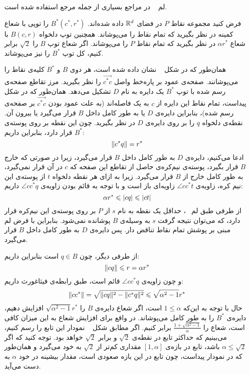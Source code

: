 
لم ~ در مراجع بسیاری از جمله مرجع  استفاده شده است.



فرض کنید مجموعه نقاط $P$ در فضای $\mathbb{R}^d$ داده شده‌اند. $B^*(c^*, r^*)$ را توپی با شعاع کمینه در نظر بگیرید که تمام نقاط را می‌پوشاند.
همچنین توپ دلخواه $B(c, r)$ با شعاع $\alpha r^*$ در نظر بگیرید که تمام نقاط $P$ را می‌پوشاند. اگر شعاع توپ $B$ را $\sqrt{2}$ برابر کنیم، کل توپ $B^*$ را نیز می‌پوشاند. 


همان‌طور که در شکل ~ نشان داده شده است، هر دوی $B$ و $B^*$ کلیه‌ی نقاط را می‌پوشانند.
صفحه‌ی عمود بر پاره‌خط واصل $\vec{c^*c}$ را نظر بگیرید.
مرز تقاطع صفحه‌ی رسم شده با توپ $B^*$ یک دایره به نام $D$ تشکیل می‌دهد.
همان‌طور که در شکل پیداست، تمام نقاط این دایره از $c$ به یک فاصله‌اند (به علت عمود بودن $\vec{c^*c}$ بر صفحه‌ی رسم شده)، بنابراین دایره‌ی $D$ یا به طور کامل داخل $B$ قرار می‌گیرد یا بیرون آن.
نقطه‌ی دلخواه $q$ را بر روی دایره‌ی $D$ در نظر بگیرید.
چون این نقطه بر روی پوسته‌ی $B^*$ قرار دارد، بنابراین داریم:
$$\|{c^* q}\| = r^*$$
ادعا می‌کنیم، دایره‌ی $D$ به طور کامل داخل $B$ قرار می‌گیرد، زیرا در صورتی که خارج $B$ قرار بگیرد، پوسته‌ی نیم‌کره‌ی حاصل از تقاطع این صفحه که $c$ در آن قرار نمی‌گیرد، به طور کامل خارج از $B$ قرار می‌گیرد.
زیرا به ازای هر نقطه دلخواه $t$ از پوسته‌ی این نیم کره، زاویه‌ی $\angle{cc^*t}$ زاویه‌ای باز است و با توجه به قائم بودن زاویه‌ی $\angle{cc^*q}$ داریم:
$$\alpha r^* \leqslant \left|{cq}\right| \leqslant \left|{ct}\right|$$
 از طرفی طبق لم ~، حداقل یک نقطه به نام $s$ از $P$ بر روی پوسته‌ی این نیم‌کره قرار دارد، که می‌توان نتیجه گرفت $s$ به وسیله‌ی $B$ پوشانده نمی‌شود.
 بنابراین با فرض لم مبنی بر پوشش تمام نقاط تناقض دار.
 پس دایره‌ی $D$ به طور کامل داخل $B$ قرار می‌گیرد. 

از طرفی دیگر، چون $q \in B$ است بنابراین داریم:
$$\|{c q}\| \leqslant r = \alpha r^*$$
و چون زاویه‌ی $\angle{cc^*q}$ قائم است، طبق‌ رابطه‌ی فیثاغورث داریم:
$$\|{cc^*}\| = \sqrt{\|{cq}\|^2 - \|{c^*q}\|^2} \leqslant \sqrt{\alpha^2 - 1} r^*$$
حال با توجه به این‌که $1 \leq \alpha$ است، اگر شعاع دایره‌ی $B$ را $\sqrt{\alpha ^ 2 - 1}r^*$ افزایش دهیم، دایره‌ی $B^*$ را به طور کامل می‌پوشاند.
در واقع برای افزایش شعاع به این میزان کافی است، شعاع را $\frac{1 + \sqrt{\alpha ^ 2 - 1}}{\alpha}$ برابر کنیم.
اگر مطابق شکل ~ نمودار این تابع را رسم کنیم، می‌بینیم که حداکثر تابع در نقطه‌ی $\sqrt{2}$ و برابر $\sqrt{2}$ خواهد بود.
توجه کنید که اگر $\alpha \leq \sqrt{2}$ باشد، تابع در بازه‌ی $[1, \alpha]$ مقداری کم‌تر از $\sqrt{2}$ به خود می‌گیرد و همان‌طور که در نمودار پیداست، چون تابع در این بازه صعودی است، مقدار بیشینه در خود $\alpha$ به دست می‌آید.

